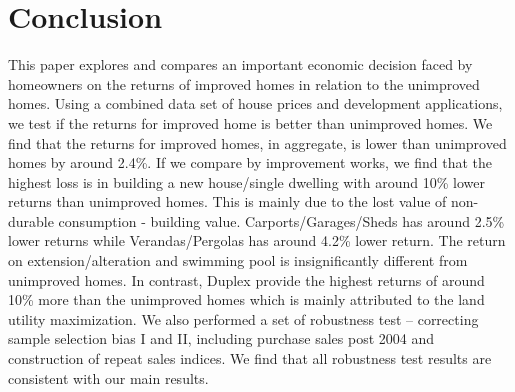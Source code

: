 \documentclass[AEJ,reqno, draftmode]{AEA} %
\begin{document}


\restoregeometry

%
%

%
%
%
%
%
%





\section{Conclusion}

This paper explores and compares an important economic decision faced by homeowners on the returns of improved homes in relation to the unimproved homes. Using a combined data set of house prices and development applications, we test if the returns for improved home is better than unimproved homes. We find that the returns for improved homes, in aggregate, is lower than unimproved homes by around 2.4\%. If we compare by improvement works, we find that the highest loss is in building a new house/single dwelling with around 10\% lower returns than unimproved homes. This is mainly due to the lost value of non-durable consumption - building value. Carports/Garages/Sheds has around 2.5\% lower returns while Verandas/Pergolas has around 4.2\% lower return. The return on extension/alteration and swimming pool is insignificantly different from unimproved homes. In contrast, Duplex provide the highest returns of around 10\% more than the unimproved homes which is mainly attributed to the land utility maximization. We also performed a set of robustness test -- correcting sample selection bias I and II, including purchase sales post 2004 and construction of repeat sales indices. We find that all robustness test results are consistent with our main results.
\end{document}
